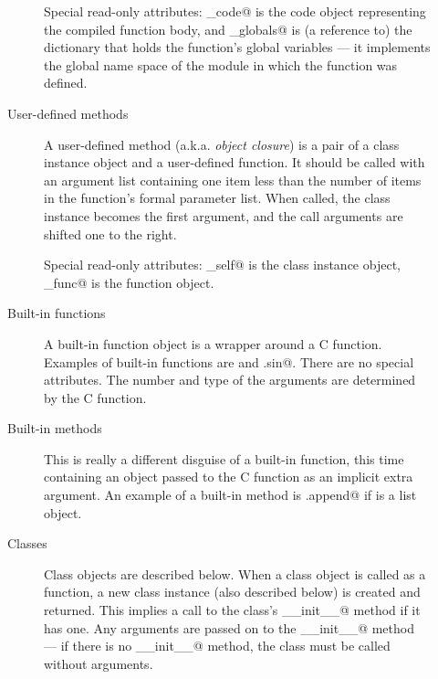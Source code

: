 \begin{description}
\begin{description}
Special read-only attributes: \verb@func_code@ is the code object
representing the compiled function body, and \verb@func_globals@ is (a
reference to) the dictionary that holds the function's global
variables --- it implements the global name space of the module in
which the function was defined.

\item[User-defined methods]
A user-defined method (a.k.a. {\em object closure}) is a pair of a
class instance object and a user-defined function.  It should be
called with an argument list containing one item less than the number
of items in the function's formal parameter list.  When called, the
class instance becomes the first argument, and the call arguments are
shifted one to the right.

Special read-only attributes: \verb@im_self@ is the class instance
object, \verb@im_func@ is the function object.

\item[Built-in functions]
A built-in function object is a wrapper around a C function.  Examples
of built-in functions are \verb@len@ and \verb@math.sin@.  There
are no special attributes.  The number and type of the arguments are
determined by the C function.

\item[Built-in methods]
This is really a different disguise of a built-in function, this time
containing an object passed to the C function as an implicit extra
argument.  An example of a built-in method is \verb@list.append@ if
\verb@list@ is a list object.

\item[Classes]
Class objects are described below.  When a class object is called as a
function, a new class instance (also described below) is created and
returned.  This implies a call to the class's \verb@__init__@ method
if it has one.  Any arguments are passed on to the \verb@__init__@
method --- if there is no \verb@__init__@ method, the class must be called
without arguments.

\end{description}


\end{description}
